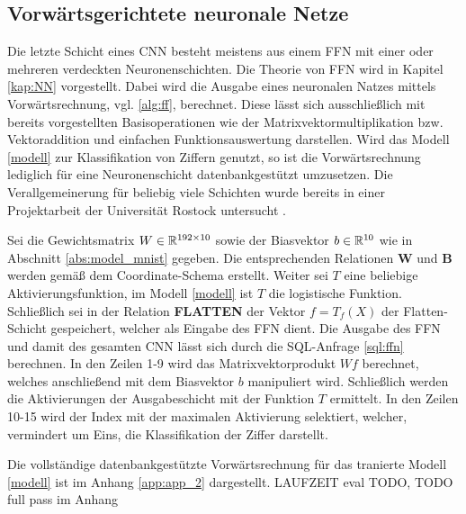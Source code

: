 \subsection*{Vorwärtsgerichtete neuronale Netze}
Die letzte Schicht eines CNN besteht meistens aus einem FFN mit einer oder mehreren verdeckten Neuronenschichten. Die Theorie von FFN wird in Kapitel \ref{kap:NN} vorgestellt. Dabei wird die Ausgabe eines neuronalen Natzes mittels Vorwärtsrechnung, vgl. \ref{alg:ff}, berechnet. Diese lässt sich ausschließlich mit bereits vorgestellten Basisoperationen wie der Matrixvektormultiplikation bzw. Vektoraddition und einfachen Funktionsauswertung darstellen. Wird das Modell \ref{modell} zur Klassifikation von Ziffern genutzt, so ist die Vorwärtsrechnung lediglich für eine Neuronenschicht datenbankgestützt umzusetzen. Die Verallgemeinerung für beliebig viele Schichten wurde bereits in einer Projektarbeit der Universität Rostock untersucht \cite{myprojekt}. 

Sei die Gewichtsmatrix $W \in \mathbb{R}^{192 \times 10}$ sowie der Biasvektor $b \in \mathbb{R}^{10}$ wie in Abschnitt \ref{abs:model_mnist} gegeben. Die entsprechenden Relationen \textbf{W} und \textbf{B} werden gemäß dem Coordinate-Schema erstellt. Weiter sei $T$ eine beliebige Aktivierungsfunktion, im Modell \ref{modell} ist $T$ die logistische Funktion. Schließlich sei in der Relation \textbf{FLATTEN} der Vektor $f=T_f(X)$ der Flatten-Schicht gespeichert, welcher als Eingabe des FFN dient. Die Ausgabe des FFN und damit des gesamten CNN lässt sich durch die SQL-Anfrage \ref{sql:ffn} berechnen. In den Zeilen 1-9 wird das Matrixvektorprodukt $Wf$ berechnet, welches anschließend mit dem Biasvektor $b$ manipuliert wird. Schließlich werden die Aktivierungen der Ausgabeschicht mit der Funktion $T$ ermittelt. In den Zeilen 10-15 wird der Index mit der maximalen Aktivierung selektiert, welcher, vermindert um Eins, die Klassifikation der Ziffer darstellt.



Die vollständige datenbankgestützte Vorwärtsrechnung für das tranierte Modell \ref{modell} ist im Anhang \ref{app:app_2} dargestellt. LAUFZEIT eval TODO, TODO full pass im Anhang
